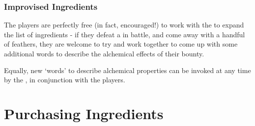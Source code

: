 \subsubsection{Improvised Ingredients}

The players are perfectly free (in fact, encouraged!) to work with the  to expand the list of ingredients - if they defeat a  in battle, and come away with a handful of feathers, they are welcome to try and work together to come up with some additional words to describe the alchemical effects of their bounty. 

Equally, new `words' to describe alchemical properties can be invoked at any time by the , in conjunction with the players. 


\section{Purchasing Ingredients}
